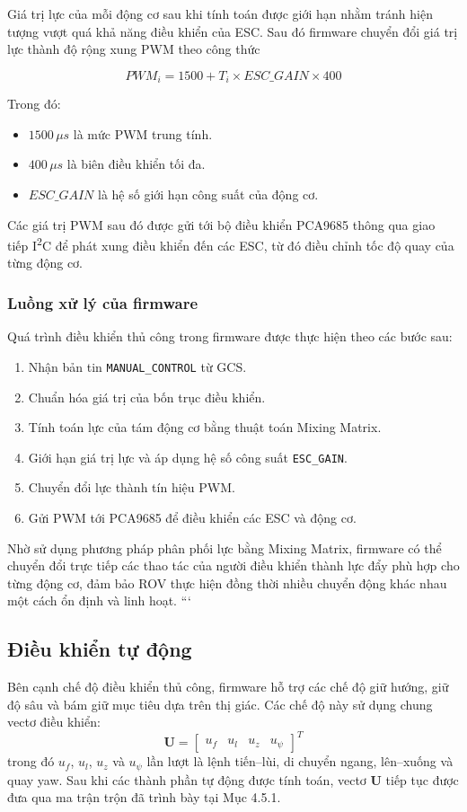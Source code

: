 \documentclass[../DoAn.tex]{subfiles}
\begin{document}
Giá trị lực của mỗi động cơ sau khi tính toán được giới hạn nhằm tránh
hiện tượng vượt quá khả năng điều khiển của ESC. Sau đó firmware chuyển
đổi giá trị lực thành độ rộng xung PWM theo công thức

\begin{equation}
PWM_i
=
1500
+
T_i
\times
ESC\_GAIN
\times
400
\end{equation}

Trong đó:

\begin{itemize}
    \item $1500\,\mu s$ là mức PWM trung tính.
    \item $400\,\mu s$ là biên điều khiển tối đa.
    \item $ESC\_GAIN$ là hệ số giới hạn công suất của động cơ.
\end{itemize}

Các giá trị PWM sau đó được gửi tới bộ điều khiển PCA9685 thông qua
giao tiếp I\textsuperscript{2}C để phát xung điều khiển đến các ESC,
từ đó điều chỉnh tốc độ quay của từng động cơ.

\subsubsection{Luồng xử lý của firmware}

Quá trình điều khiển thủ công trong firmware được thực hiện theo các
bước sau:

\begin{enumerate}
    \item Nhận bản tin \texttt{MANUAL\_CONTROL} từ GCS.
    \item Chuẩn hóa giá trị của bốn trục điều khiển.
    \item Tính toán lực của tám động cơ bằng thuật toán Mixing Matrix.
    \item Giới hạn giá trị lực và áp dụng hệ số công suất
    \texttt{ESC\_GAIN}.
    \item Chuyển đổi lực thành tín hiệu PWM.
    \item Gửi PWM tới PCA9685 để điều khiển các ESC và động cơ.
\end{enumerate}

Nhờ sử dụng phương pháp phân phối lực bằng Mixing Matrix, firmware có
thể chuyển đổi trực tiếp các thao tác của người điều khiển thành lực
đẩy phù hợp cho từng động cơ, đảm bảo ROV thực hiện đồng thời nhiều
chuyển động khác nhau một cách ổn định và linh hoạt.
```


\subsection{Điều khiển tự động}
Bên cạnh chế độ điều khiển thủ công, firmware hỗ trợ các chế độ giữ hướng, giữ độ sâu và bám giữ mục tiêu dựa trên thị giác. Các chế độ này sử dụng chung vectơ điều khiển:
\[
\mathbf{U} = 
\begin{bmatrix}
u_f & u_l & u_z & u_\psi
\end{bmatrix}^{T}
\]
trong đó $u_f$, $u_l$, $u_z$ và $u_\psi$ lần lượt là lệnh tiến--lùi, di chuyển ngang, lên--xuống và quay yaw. Sau khi các thành phần tự động được tính toán, vectơ $\mathbf{U}$ tiếp tục được đưa qua ma trận trộn đã trình bày tại Mục 4.5.1.
\end{document}
